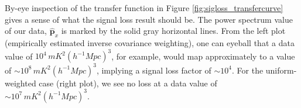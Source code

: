 \documentclass[preprint2,numberedappendix,tighten]{aastex6}  %
\newcommand{\phat}{\widehat{\mathbf{p}}}
\begin{document}

By-eye inspection of the transfer function in Figure \ref{fig:sigloss_transfercurve} gives a sense of what the signal loss result should be. The power spectrum value of our data, $
\widehat{\textbf{p}}_{x}$ is marked by the solid gray horizontal lines. From the left plot (empirically estimated inverse covariance weighting), one can eyeball that a data value of $10^{4} \, mK^{2} (h^{-1} Mpc)^{3}$, for example, would map approximately to a 
value of $\sim10^{8} \, mK^{2} (h^{-1} Mpc)^{3}$, implying a signal loss factor of $\sim10^{4}$. For the uniform-weighted case (right plot), we see no loss at a data value of $\sim10^{7} \, mK^{2} (h^{-1} Mpc)^{3}$.
\end{document}
